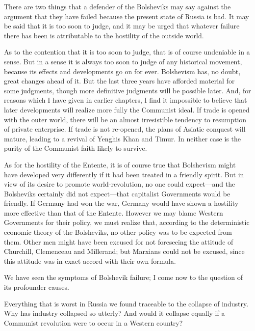 There are two things that a defender of the Bolsheviks may say against the argument that they have failed because the present state of Russia is bad. It may be said that it is too soon to judge, and it may be urged that whatever failure there has been is attributable to the hostility of the outside world.

As to the contention that it is too soon to judge, that is of course undeniable in a sense. But in a sense it is always too soon to judge of any historical movement, because its effects and developments go on for ever. Bolshevism has, no doubt, great changes ahead of it. But the last three years have afforded material for some judgments, though more definitive judgments will be possible later. And, for reasons which I have given in earlier chapters, I find it impossible to believe that later developments will realize more fully the Communist ideal. If trade is opened with the outer world, there will be an almost irresistible tendency to resumption of private enterprise. If trade is not re-opened, the plans of Asiatic conquest will mature, leading to a revival of Yenghis Khan and Timur. In neither case is the purity of the Communist faith likely to survive.

As for the hostility of the Entente, it is of course true that Bolshevism might have developed very differently if it had been treated in a friendly spirit. But in view of its desire to promote world-revolution, no one could expect---and the Bolsheviks certainly did not expect---that capitalist Governments would be friendly. If Germany had won the war, Germany would have shown a hostility more effective than that of the Entente. However we may blame Western Governments for their policy, we must realize that, according to the deterministic economic theory of the Bolsheviks, no other policy was to be expected from them. Other men might have been excused for not foreseeing the attitude of Churchill, Clemenceau and Millerand; but Marxians could not be excused, since this attitude was in exact accord with their own formula.

We have seen the symptoms of Bolshevik failure; I come now to the question of its profounder causes.

Everything that is worst in Russia we found traceable to the collapse of industry. Why has industry collapsed so utterly? And would it collapse equally if a Communist revolution were to occur in a Western country?

